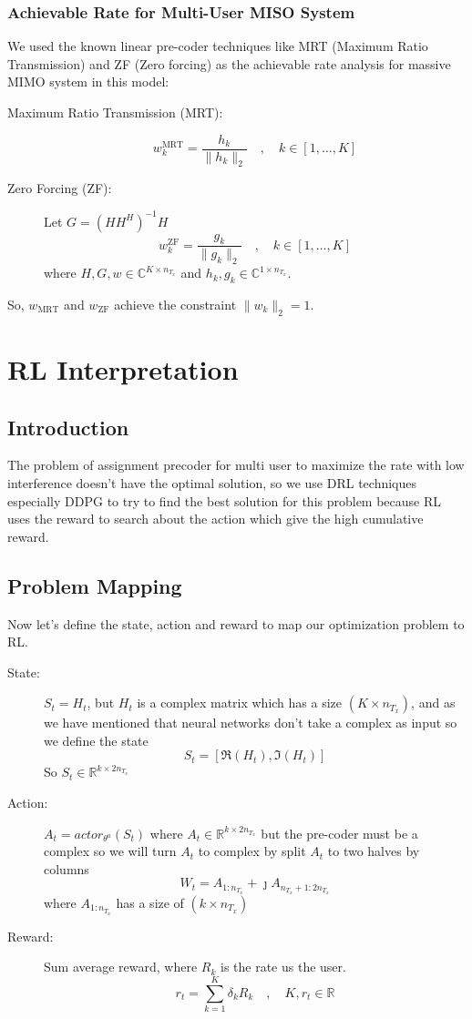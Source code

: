 \subsubsection{Achievable Rate for Multi-User MISO System}
We used the known linear pre-coder techniques like MRT (Maximum Ratio Transmission) and ZF (Zero forcing) as the achievable rate analysis for massive MIMO system in this model:
\begin{description}
    \item[Maximum Ratio Transmission (MRT):] \[ w_k^{\text{MRT}} = \frac{h_k}{\|h_k\|_2} \quad , \quad k \in [1, \ldots , K] \]
    \item[Zero Forcing (ZF):] Let $G = \left( H H^H \right)^{-1} H$ \[ w_k^{\text{ZF}} = \frac{g_k}{\|g_k\|_2} \quad , \quad k \in [1, \ldots , K] \]where $H, G, w \in \mathbb{C}^{K \times n_{T_x}}$ and $h_k, g_k \in \mathbb{C}^{1 \times n_{T_x}}$.
\end{description}
So, $w_{\text{MRT}}$ and $w_{\text{ZF}}$ achieve the constraint $\|w_k\|_2 = 1$.

\section{RL Interpretation}
\subsection{Introduction}
The problem of assignment precoder for multi user to maximize the rate with low interference doesn't have the optimal solution, so we use DRL techniques especially DDPG to try to find the best solution for this problem because RL uses the reward to search about the action which give the high cumulative reward.
\subsection{Problem Mapping}
Now let's define the state, action and reward to map our optimization problem to RL.
\begin{description}
    \item[State:] $S_t=H_t$, but $H_t$ is a complex matrix which has a size $({K \times n}_{T_x})$, and as we have mentioned that neural networks don't take a complex as input so we define the state \[ S_t = \left[ \Re(H_t) , \Im(H_t) \right] \]So $S_t \in \mathbb{R}^{k \times 2n_{T_x}}$
    \item[Action:] $A_t = actor_{\theta^a} (S_t)$ where $A_t \in \mathbb{R}^{k \times 2n_{T_x}}$ but the pre-coder must be a complex so we will turn $A_t$ to complex by split $A_t$ to two halves by columns \[ W_t = A_{1:n_{T_x}} + \jmath A_{n_{T_x}+1 : 2n_{T_x}} \]where $A_{1:n_{T_x}}$ has a size of $(k \times n_{T_x})$
    \item[Reward:] Sum average reward, where $R_k$ is the rate us the user.\[r_t = \sum_{k=1}^{K} \delta_k R_k \quad , \quad K, r_t \in \mathbb{R}\]
\end{description}
